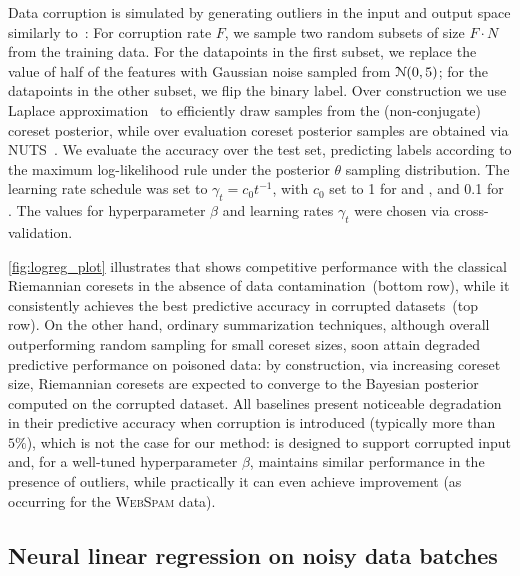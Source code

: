 Data corruption is simulated by generating outliers in the input and output space similarly to~\citep{futami18}: For corruption rate $F$, we sample two random subsets of size $F\cdot N$ from the training data.  For the datapoints in the first subset, we replace the value of half of the features with Gaussian noise sampled \iid from $\mathcal{N}(0,5)$; for the datapoints in the other subset, we flip the binary label. Over construction we use Laplace approximation~\citep{mackay03} to efficiently draw samples from the (non-conjugate) coreset posterior, while over evaluation coreset posterior samples are obtained via NUTS~\citep{hoffman14}. We evaluate the accuracy over the test set, predicting labels according to the maximum log-likelihood rule under the posterior $\theta$ sampling distribution. The learning rate schedule was set to $\gamma_t=c_0 t^{-1}$, with $c_0$ set to 1 for \sparsevi{} and \bcores{}, and 0.1 for \psvi. 
The values for hyperparameter $\beta$ and learning rates $\gamma_t$ were chosen via cross-validation. 

\cref{fig:logreg_plot} illustrates that \bcores{} shows competitive performance with the classical Riemannian coresets in the absence of data contamination~(bottom row), while it consistently achieves the best predictive accuracy in corrupted datasets~(top row).  On the other hand, ordinary summarization techniques, although overall outperforming random sampling for small coreset sizes, soon attain degraded predictive performance on poisoned data: by construction, via increasing coreset size, Riemannian coresets are expected to converge to the Bayesian posterior computed on the corrupted dataset. All baselines present noticeable degradation in their predictive accuracy when corruption is introduced (typically more than $5\%$), which is not the case for our method: \bcores{} is designed to support corrupted input and, for a well-tuned hyperparameter $\beta$, maintains similar performance in the presence of outliers, while practically it can even achieve improvement (as occurring for the \textsc{WebSpam} data).


\subsection{Neural linear regression on noisy data batches}
\label{subsec:neur-linr-expt}

